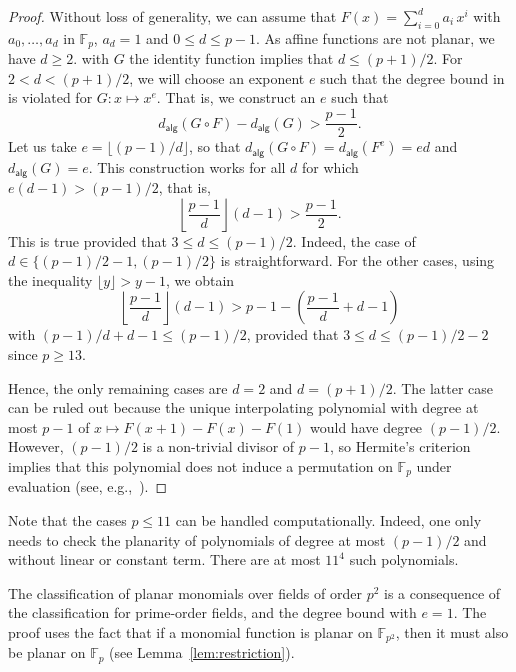 \documentclass[12pt]{article}
\newcommand{\F}{\mathbb{F}}
\newcommand{\adeg}[1]{d_{\mathsf{alg}}(#1)}
\begin{document}
\begin{proof}
Without loss of generality, we can assume that $F(x) = \sum_{i=0}^{d}a_i\,x^i$ with $a_0, \ldots, a_d$ in $\F_p$, $a_d = 1$ and $0 \leq d \leq p-1$. As affine functions are not planar, we have $d \geq 2$. 
 with $G$ the identity function implies that $d \le (p + 1) / 2$.
For $2 < d < (p+1)/2$, we will choose an exponent $e$ such that the degree bound in  is violated for $G : x \mapsto x^e$. 
That is, we construct an $e$ such that
\begin{equation*}
\adeg{G \circ F} - \adeg{G} > \frac{p - 1}{2}.
\end{equation*}
Let us take $e = \lfloor (p - 1)/d \rfloor$, so that $\adeg{G \circ F} = \adeg{F^e} = ed$ and $\adeg{G} = e$. This construction works for all $d$ for which $e(d - 1) > (p - 1) / 2$, that is,
\begin{equation*}
\left\lfloor\frac{p - 1}{d}\right\rfloor (d - 1) > \frac{p - 1}{2}.
\end{equation*}
This is true provided that $3 \le d \le (p - 1) / 2$. Indeed, the case of $d \in \{ (p-1)/2 -1, (p-1)/2\}$ is straightforward. For the other cases, using the inequality $\lfloor y \rfloor > y-1$, we obtain
\begin{equation*}
\left\lfloor\frac{p - 1}{d}\right\rfloor (d - 1) > p-1 - \left(\frac{p-1}{d} + d -1 \right)
\end{equation*}
with $(p-1)/d + d -1 \leq (p-1)/2$, provided that $3 \leq d \leq (p-1)/2-2$ since $p \ge 13$.

Hence, the only remaining cases are $d = 2$ and $d = (p + 1) / 2$. The latter case can be ruled out because the unique interpolating polynomial with degree at most $p - 1$ of $x \mapsto F(x+1) - F(x) - F(1)$ would have degree $(p-1)/2$. However, $(p-1)/2$ is a non-trivial divisor of $p-1$, so Hermite's criterion implies that this polynomial does not induce a permutation on $\F_p$ under evaluation (see, e.g.,~\cite[Corollary 7.5]{Lidl_Niederreiter_1996}). 
\end{proof}

Note that the cases $p \leq 11$ can be handled computationally. Indeed, one only needs to check the planarity of polynomials of degree at most $(p-1)/2$ and without linear or constant term. There are at most $11^4$ such polynomials.

The classification of planar monomials over fields of order $p^2$ is a consequence of the classification for prime-order fields, and the degree bound with $e = 1$.
The proof uses the fact that if a monomial function is planar on $\F_{p^2}$, then it must also be planar on $\F_p$ (see Lemma~\ref{lem:restriction}).
\end{document}

